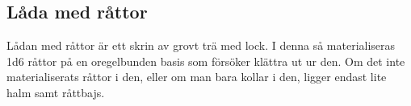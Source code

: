 \subsection{Låda med råttor}
\label{ladaMedRattor}
Lådan med råttor är ett skrin av grovt trä med lock. I denna så materialiseras 1d6 råttor på en oregelbunden basis som försöker klättra ut ur den. Om det inte materialiserats råttor i den, eller om man bara kollar i den, ligger endast lite halm samt råttbajs.